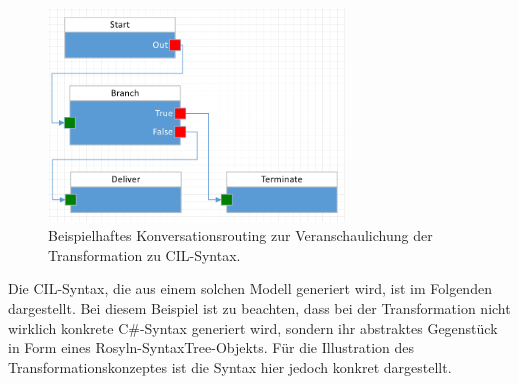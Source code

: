 \begin{figure} %
	\centering
		\includegraphics[width=0.7\textwidth]{img/FlowToCodeExample.png}
	\caption[Beispielhaftes Konversationsrouting zur Veranschaulichung der Transformation zu CIL-Syntax]{Beispielhaftes Konversationsrouting zur Veranschaulichung der Transformation zu CIL-Syntax.}
	\label{fig:FlowToCode}
\end{figure}

Die CIL-Syntax, die aus einem solchen Modell generiert wird, ist im Folgenden dargestellt. Bei diesem Beispiel ist zu beachten, dass bei der Transformation nicht wirklich konkrete C\#-Syntax generiert wird, sondern ihr abstraktes Gegenstück in Form eines Rosyln-SyntaxTree-Objekts. Für die Illustration des Transformationskonzeptes ist die Syntax hier jedoch konkret dargestellt.
\newpage



